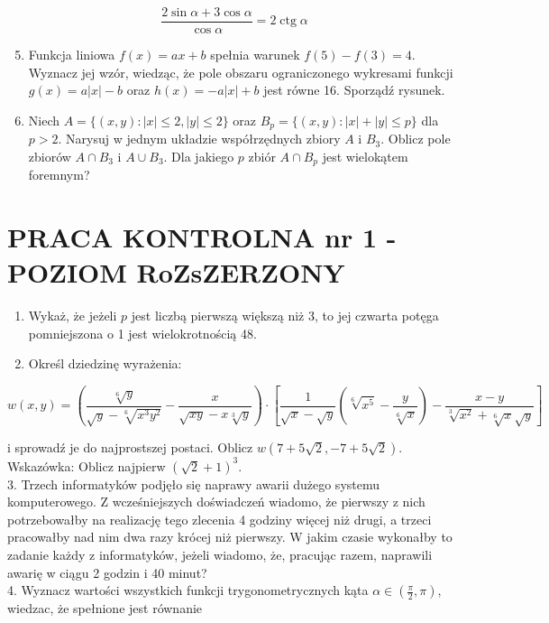 \documentclass[10pt]{article}
\begin{document}
$$
\frac{2 \sin \alpha+3 \cos \alpha}{\cos \alpha}=2 \operatorname{ctg} \alpha
$$

\begin{enumerate}
  \setcounter{enumi}{4}
  \item Funkcja liniowa $f(x)=a x+b$ spełnia warunek $f(5)-f(3)=4$. Wyznacz jej wzór, wiedząc, że pole obszaru ograniczonego wykresami funkcji $g(x)=a|x|-b$ oraz $h(x)=-a|x|+b$ jest równe 16. Sporządź rysunek.
  \item Niech $A=\{(x, y):|x| \leqslant 2,|y| \leqslant 2\}$ oraz $B_{p}=\{(x, y):|x|+|y| \leqslant p\}$ dla $p>2$. Narysuj w jednym układzie współrzędnych zbiory $A$ i $B_{3}$. Oblicz pole zbiorów $A \cap B_{3}$ i $A \cup B_{3}$. Dla jakiego $p$ zbiór $A \cap B_{p}$ jest wielokątem foremnym?
\end{enumerate}

\section*{PRACA KONTROLNA nr 1 - POZIOM RoZsZERZONY}
\begin{enumerate}
  \item Wykaż, że jeżeli $p$ jest liczbą pierwszą większą niż 3, to jej czwarta potęga pomniejszona o 1 jest wielokrotnością 48.
  \item Określ dziedzinę wyrażenia:
\end{enumerate}

$$
w(x, y)=\left(\frac{\sqrt[6]{y}}{\sqrt{y}-\sqrt[6]{x^{3} y^{2}}}-\frac{x}{\sqrt{x y}-x \sqrt[3]{y}}\right) \cdot\left[\frac{1}{\sqrt{x}-\sqrt{y}}\left(\sqrt[6]{x^{5}}-\frac{y}{\sqrt[6]{x}}\right)-\frac{x-y}{\sqrt[3]{x^{2}}+\sqrt[6]{x} \sqrt{y}}\right]
$$

i sprowadź je do najprostszej postaci. Oblicz $w(7+5 \sqrt{2},-7+5 \sqrt{2})$.\\
Wskazówka: Oblicz najpierw $(\sqrt{2}+1)^{3}$.\\
3. Trzech informatyków podjęło się naprawy awarii dużego systemu komputerowego. Z wcześniejszych doświadczeń wiadomo, że pierwszy z nich potrzebowałby na realizację tego zlecenia 4 godziny więcej niż drugi, a trzeci pracowałby nad nim dwa razy krócej niż pierwszy. W jakim czasie wykonałby to zadanie każdy z informatyków, jeżeli wiadomo, że, pracując razem, naprawili awarię w ciągu 2 godzin i 40 minut?\\
4. Wyznacz wartości wszystkich funkcji trygonometrycznych kąta $\alpha \in\left(\frac{\pi}{2}, \pi\right)$, wiedzac, że spełnione jest równanie
\end{document}
